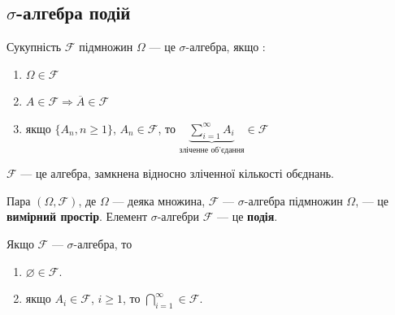 \subsection[Сигма-алгебра подій]{$\sigma$-алгебра подій}

\begin{definition}
    Сукупність $\mathcal{F}$ підмножин $\Omega$ --- це  $\sigma$-алгебра, якщо :

    \begin{enumerate}
        \item $\Omega \in \mathcal{F}$
        \item $A \in \mathcal{F} \Rightarrow \overline{A} \in \mathcal{F}$
        \item якщо $\{ A_n, n \geqslant 1 \}$, $A_n \in \mathcal{F}$,
            то $\underbrace{\sum\limits_{i=1}^{\infty} A_{i}}_{\text{зліченне об'єдання}}
            \in \mathcal{F}$
    \end{enumerate}
\end{definition}

$\mathcal{F}$ --- це алгебра, замкнена відносно зліченної кількості обєднань.

\begin{definition}
    Пара $(\Omega, \mathcal{F})$, де $\Omega$ --- деяка множина,
    $\mathcal{F}$ ---  $\sigma$-алгебра підмножин $\Omega$, 
    --- це \textbf{вимірний простір}. Елемент $\sigma$-алгебри
    $\mathcal{F}$ --- це \textbf{подія}.
\end{definition}

\begin{claim}
    Якщо $\mathcal{F}$ --- $\sigma$-алгебра, то

    \begin{enumerate}
        \item $\varnothing \in \mathcal{F}.$
        \item якщо $A_i \in \mathcal{F}$, $i \geqslant 1$, то
            $\bigcap\limits_{i=1}^{\infty} \in \mathcal{F}$.
    \end{enumerate}
\end{claim}

